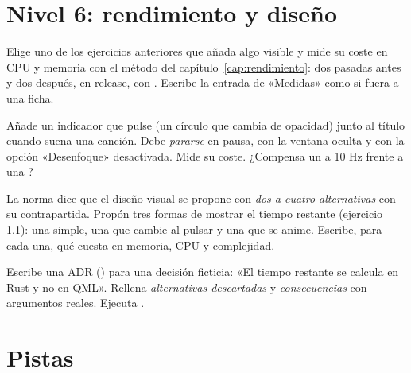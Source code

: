 \section{Nivel 6: rendimiento y diseño}

\begin{ejercicio}
Elige uno de los ejercicios anteriores que añada algo visible y mide su coste en CPU y memoria
con el método del capítulo~\ref{cap:rendimiento}: dos pasadas antes y dos después, en release,
con . Escribe la entrada de «Medidas» como si fuera a una ficha.
\end{ejercicio}

\begin{ejercicio}
Añade un indicador que pulse (un círculo que cambia de opacidad) junto al título cuando suena
una canción. Debe \emph{pararse} en pausa, con la ventana oculta y con la opción
«Desenfoque» desactivada. Mide su coste. ¿Compensa un  a 10 Hz frente a una
?
\end{ejercicio}

\begin{ejercicio}
La norma dice que el diseño visual se propone con \emph{dos a cuatro alternativas} con su
contrapartida. Propón tres formas de mostrar el tiempo restante (ejercicio 1.1): una
simple, una que cambie al pulsar y una que se anime. Escribe, para cada una, qué cuesta en
memoria, CPU y complejidad.
\end{ejercicio}

\begin{ejercicio}
Escribe una ADR () para una decisión ficticia:
«El tiempo restante se calcula en Rust y no en QML». Rellena \emph{alternativas descartadas} y
\emph{consecuencias} con argumentos reales. Ejecuta .
\end{ejercicio}

\section{Pistas}


